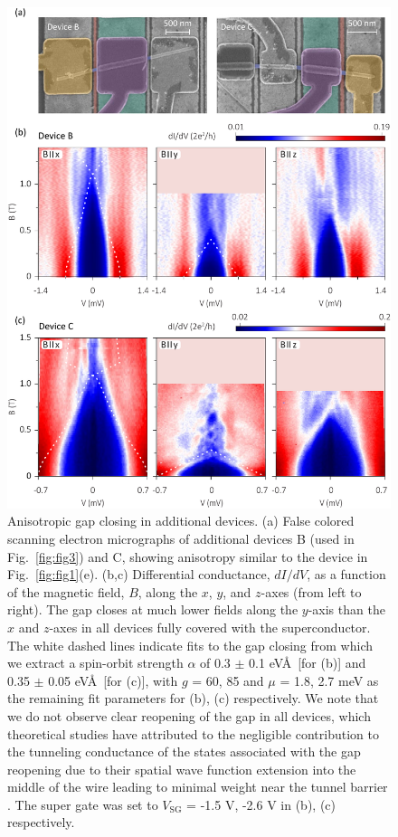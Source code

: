 \begin{figure}
\begin{center}
\centering
\includegraphics[width=0.7\columnwidth]{chapter_spinorbit/figures/SFig1_Bsweeps_reproduced.pdf}
\caption{\label{fig:BsweepsReproduced}
Anisotropic gap closing in additional devices.
(a) False colored scanning electron micrographs of additional devices B (used in Fig.~\ref{fig:fig3}) and C, showing anisotropy similar to the device in Fig.~\ref{fig:fig1}(e).
(b,c) Differential conductance, $dI/dV$, as a function of the magnetic field, $B$, along the $x$, $y$, and $z$-axes (from left to right).
The gap closes at much lower fields along the $y$-axis than the $x$ and $z$-axes in all devices fully covered with the superconductor.
The white dashed lines indicate fits to the gap closing from which we extract a spin-orbit strength $\alpha$ of 0.3 $\pm$ 0.1 eV\AA\ [for (b)] and 0.35 $\pm$ 0.05 eV\AA\ [for (c)], with $g$ = 60, 85 and $\mu$ = 1.8, 2.7 meV as the remaining fit parameters for (b), (c) respectively.
We note that we do not observe clear reopening of the gap in all devices, which theoretical studies have attributed to the negligible contribution to the tunneling conductance of the states associated with the gap reopening due to their spatial wave function extension into the middle of the wire leading to minimal weight near the tunnel barrier \cite{Prada2012,Pientka2012,Stanescu2012,Liu2019}.
The super gate was set to $V_{\mathrm{SG}}$ = -1.5 V, -2.6 V in (b), (c) respectively.
}
\end{center}
\end{figure}

